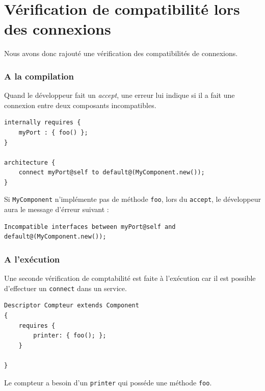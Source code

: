 \documentclass[11pt,a4paper,openany,oneside]{book}
\begin{document}
\section{Vérification de compatibilité lors des connexions}

Nous avons donc rajouté une vérification des compatibilités de connexions.

\subsubsection{A la compilation}

Quand le développeur fait un \textit{accept}, une erreur lui indique si il a fait une connexion entre deux composants incompatibles.

\begin{lstlisting}[language=Compo, frame=single, caption=Exemple de connection incorrect]
internally requires {
    myPort : { foo() };
}

architecture {
    connect myPort@self to default@(MyComponent.new());
}
\end{lstlisting}

Si \texttt{MyComponent} n'implémente pas de méthode \texttt{foo}, lors du \texttt{accept}, le développeur aura le message d'érreur suivant : 

\begin{lstlisting}[language=Compo, frame=single, caption=Message d'erreur lorsque les interfaces sont incompatibles]
Incompatible interfaces between myPort@self and default@(MyComponent.new());
\end{lstlisting}

\subsubsection{A l'exécution}

Une seconde vérification de comptabilité est faite à l'exécution car il est possible d'effectuer un \texttt{connect} dans un service.

\clearpage

\begin{lstlisting}[language=Compo, frame=single, caption=Extrait d'un descripteur Compteur]
Descriptor Compteur extends Component
{
	requires {
		printer: { foo(); };
	}
	
}
\end{lstlisting}

Le compteur a besoin d'un \texttt{printer} qui posséde une méthode \texttt{foo}.
\end{document}
